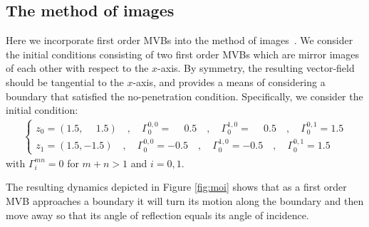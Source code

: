 \documentclass[12pt]{amsart}
\theoremstyle{remark}
\begin{document}
\subsection{The method of images}
\label{sec:method_of_images}
Here we incorporate first order MVBs into the method of images~\cite{Jackson1975}.
We consider the initial conditions consisting of two first order MVBs which are mirror images of each other with respect to the $x$-axis.
By symmetry, the resulting vector-field should be tangential to the $x$-axis, and provides a means of considering a boundary that satisfied the no-penetration condition.
Specifically, we consider the initial condition:
\begin{align}
	\begin{cases}
	z_0 = (1.5 , \phantom{-}1.5)\quad, \quad \Gamma_0^{0,0} = \phantom{-}0.5 \quad,\quad \Gamma_0^{1,0} = \phantom{-}0.5 \quad,\quad \Gamma_0^{0,1} = 1.5 \\
	z_1 = (1.5,-1.5)\quad, \quad \Gamma_0^{0,0} = -0.5 \quad,\quad \Gamma_0^{1,0} = -0.5 \quad,\quad \Gamma_0^{0,1} =1.5
	\end{cases}
	\label{eq:ic moi}
\end{align}
with $\Gamma_i^{mn} = 0$ for $m+n > 1$ and $i=0,1$.

The resulting dynamics depicted in Figure \ref{fig:moi} shows that as a first order MVB approaches a boundary it will turn its motion along the boundary and then move away so that its angle of reflection equals its angle of incidence. 
\end{document}
